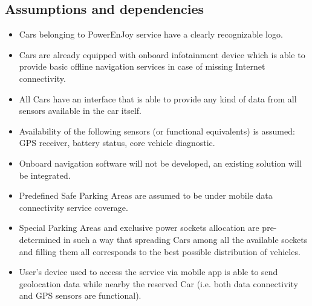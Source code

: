 \subsection{Assumptions and dependencies}
\begin{itemize}
\item Cars belonging to PowerEnJoy service have a clearly recognizable logo.
\item Cars are already equipped with onboard infotainment device which is able to provide basic offline navigation services in case of missing Internet connectivity.
\item All Cars have an interface that is able to provide any kind of data from all sensors available in the car itself.
\item Availability of the following sensors (or functional equivalents) is assumed: GPS receiver, battery status, core vehicle diagnostic.
\item Onboard navigation software will not be developed, an existing solution will be integrated.
\item Predefined Safe Parking Areas are assumed to be under mobile data connectivity service coverage.
\item Special Parking Areas and exclusive power sockets allocation are pre-determined in such a way that spreading Cars among all the available sockets and filling them all corresponds to the best possible distribution of vehicles.
\item User's device used to access the service via mobile app is able to send geolocation data while nearby the reserved Car (i.e. both data connectivity and GPS sensors are functional).
\end{itemize}

